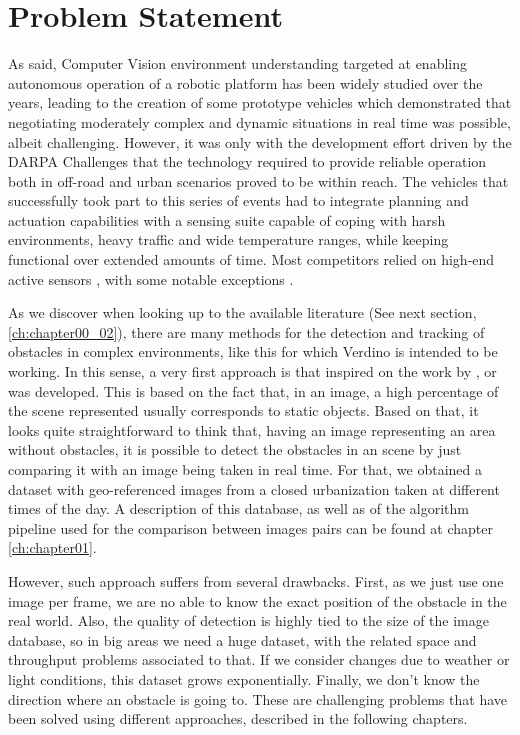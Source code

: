 \section{Problem Statement}\label{ch:chapter00_01}

As said, Computer Vision environment understanding targeted at enabling autonomous operation of a robotic platform has been widely studied over the years, leading to the creation of some prototype vehicles \cite{Maurer1996,Pomerleau1996,Broggi1999} which demonstrated that negotiating moderately complex and dynamic situations in real time was possible, albeit challenging. However, it was only with the development effort driven by the DARPA Challenges \cite{Buehler2007, Buehler2009} that the technology required to provide reliable operation both in off-road and urban scenarios proved to be within reach.
The vehicles that successfully took part to this series of events had to integrate planning and actuation capabilities with a sensing suite capable of coping with harsh environments, heavy traffic and wide temperature ranges, while keeping functional over extended amounts of time. Most competitors relied on high-end active sensors \cite{Urmson2008, Montemerlo2008, Bacha2008, Kammel2008}, with some notable exceptions \cite{Broggi2006, Broggi2010}. 

As we discover when looking up to the available literature (See next section, \ref{ch:chapter00_02}), there are many methods for the detection and tracking of obstacles in complex environments, like this for which Verdino is intended to be working. In this sense, a very first approach is that inspired on the work by \cite{primdahl2005change},  \cite{diego2011video} or \cite{vallespi2012prior} was developed. This is based on the fact that, in an image, a high percentage of the scene represented usually corresponds to static objects. Based on that, it looks quite straightforward to think that, having an image representing an area without obstacles, it is possible to detect the obstacles in an scene by just comparing it with an image being taken in real time. For that, we obtained a dataset with geo-referenced images from a closed urbanization taken at different times of the day. A description of this database, as well as of the algorithm pipeline used for the comparison between images pairs can be found at chapter \ref{ch:chapter01}.

However, such approach suffers from several drawbacks. First, as we just use one image per frame, we are no able to know the exact position of the obstacle in the real world. Also, the quality of detection is highly tied to the size of the image database, so in big areas we need a huge dataset, with the related space and throughput problems associated to that. If we consider changes due to weather or light conditions, this dataset grows exponentially. Finally, we don't know the direction where an obstacle is going to. These are challenging problems that have been solved using different approaches, described in the following chapters.

